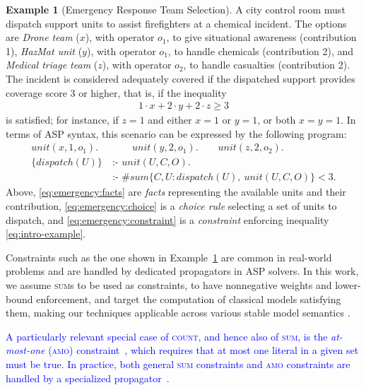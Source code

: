 \documentclass[preprint,authoryear]{elsarticle}
\theoremstyle{definition}
\newtheorem{example}{Example}[section]
\begin{document}
\begin{example}[Emergency Response Team Selection]\label{ex:emergency}
A city control room must dispatch support units to assist firefighters at a chemical incident.
The options are 
\emph{Drone team} ($x$), with operator $o_1$, to give situational awareness (contribution 1),
\emph{HazMat unit} ($y$), with operator $o_1$, to handle chemicals (contribution 2), and
\emph{Medical triage team} ($z$), with operator $o_2$, to handle casualties (contribution 2).
The incident is considered adequately covered if the dispatched support provides coverage score 3 or higher, that is, if the inequality
\begin{align}\label{eq:intro-example}
    1 \cdot x + 2 \cdot y + 2 \cdot z \geq 3
\end{align}  
is satisfied;
for instance, if $z = 1$ and either $x = 1$ or $y = 1$, or both $x = y = 1$.
In terms of ASP syntax, this scenario can be expressed by the following program:
\begin{align}
    \mathit{unit}(x,1,o_1). &\qquad \mathit{unit}(y,2,o_1).\qquad \mathit{unit}(z,2,o_2). \label{eq:emergency:facts}  \\
    \{\mathit{dispatch}(U)\}\ & \text{:- } \mathit{unit}(U,C,O). \label{eq:emergency:choice} \\
    & \text{:- } \#\mathit{sum}\{C,U : \mathit{dispatch}(U),\  \mathit{unit}(U,C,O)\} < 3. \label{eq:emergency:constraint}
\end{align}
Above, \eqref{eq:emergency:facts} are \emph{facts} representing the available units and their contribution,
\eqref{eq:emergency:choice} is a \emph{choice rule} selecting a set of units to dispatch, and
\eqref{eq:emergency:constraint} is a \emph{constraint} enforcing inequality \eqref{eq:intro-example}.
\end{example}
%
Constraints such as the one shown in Example~\ref{ex:emergency} are common in real-world problems and are handled by dedicated propagators in ASP solvers.
In this work, we assume \textsc{sum}s to be used as constraints, to have nonnegative weights and lower-bound enforcement, and target the computation of classical models satisfying them, making our techniques applicable across various stable model semantics \citep{DBLP:journals/tplp/AlvianoFG23}.

\textcolor{blue}{A particularly relevant special case of \textsc{count}, and hence also of \textsc{sum}, is the \emph{at-most-one} (\textsc{amo}) constraint~\citep{DBLP:conf/ictai/Surynek20}, which requires that at most one literal in a given set must be true.
In practice, both general \textsc{sum} constraints and \textsc{amo} constraints are handled by a specialized propagator~\citep{DBLP:conf/iclp/GebserKKS09,DBLP:journals/fuin/FaberLMR11}.}
\end{document}
